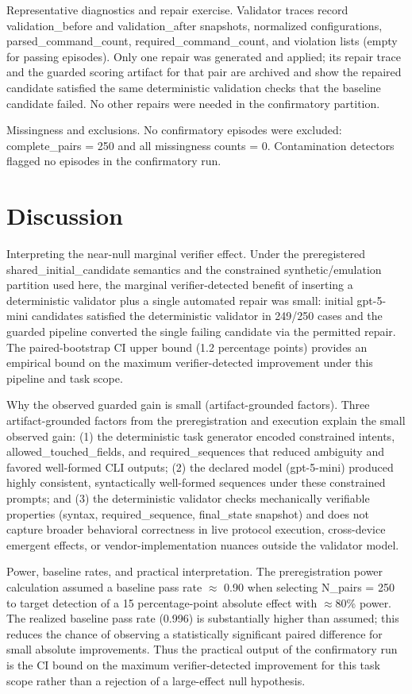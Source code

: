 \documentclass[conference]{IEEEtran}
\begin{document}
Representative diagnostics and repair exercise. Validator traces record validation\_before and validation\_after snapshots, normalized configurations, parsed\_command\_count, required\_command\_count, and violation lists (empty for passing episodes). Only one repair was generated and applied; its repair trace and the guarded scoring artifact for that pair are archived and show the repaired candidate satisfied the same deterministic validation checks that the baseline candidate failed. No other repairs were needed in the confirmatory partition.

Missingness and exclusions. No confirmatory episodes were excluded: complete\_pairs = 250 and all missingness counts = 0. Contamination detectors flagged no episodes in the confirmatory run.

\section{Discussion}
Interpreting the near-null marginal verifier effect. Under the preregistered shared\_initial\_candidate semantics and the constrained synthetic/emulation partition used here, the marginal verifier-detected benefit of inserting a deterministic validator plus a single automated repair was small: initial gpt-5-mini candidates satisfied the deterministic validator in 249/250 cases and the guarded pipeline converted the single failing candidate via the permitted repair. The paired-bootstrap CI upper bound (1.2 percentage points) provides an empirical bound on the maximum verifier-detected improvement under this pipeline and task scope.

Why the observed guarded gain is small (artifact-grounded factors). Three artifact-grounded factors from the preregistration and execution explain the small observed gain: (1) the deterministic task generator encoded constrained intents, allowed\_touched\_fields, and required\_sequences that reduced ambiguity and favored well-formed CLI outputs; (2) the declared model (gpt-5-mini) produced highly consistent, syntactically well-formed sequences under these constrained prompts; and (3) the deterministic validator checks mechanically verifiable properties (syntax, required\_sequence, final\_state snapshot) and does not capture broader behavioral correctness in live protocol execution, cross-device emergent effects, or vendor-implementation nuances outside the validator model.

Power, baseline rates, and practical interpretation. The preregistration power calculation assumed a baseline pass rate \ensuremath{\approx} 0.90 when selecting N\_pairs = 250 to target detection of a 15 percentage-point absolute effect with \ensuremath{\approx}80\% power. The realized baseline pass rate (0.996) is substantially higher than assumed; this reduces the chance of observing a statistically significant paired difference for small absolute improvements. Thus the practical output of the confirmatory run is the CI bound on the maximum verifier-detected improvement for this task scope rather than a rejection of a large-effect null hypothesis.
\end{document}
